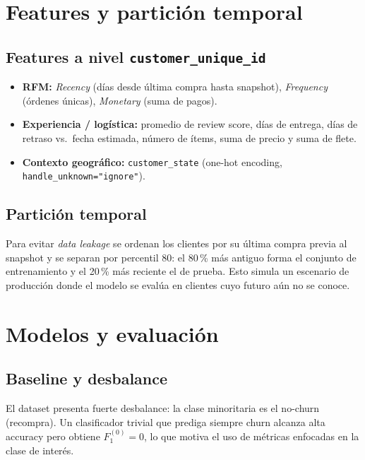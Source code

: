 \documentclass[11pt]{article}
\begin{document}
\section{Features y partición temporal}

\subsection*{Features a nivel \texttt{customer\_unique\_id}}

\begin{itemize}[itemsep=1pt, topsep=2pt]
  \item \textbf{RFM:} \textit{Recency} (días desde última compra hasta snapshot),
        \textit{Frequency} (órdenes únicas), \textit{Monetary} (suma de pagos).
  \item \textbf{Experiencia / logística:} promedio de review score, días de
        entrega, días de retraso vs.\ fecha estimada, número de ítems, suma de
        precio y suma de flete.
  \item \textbf{Contexto geográfico:} \texttt{customer\_state} (one-hot encoding,
        \texttt{handle\_unknown="ignore"}).
\end{itemize}

\subsection*{Partición temporal}

Para evitar \textit{data leakage} se ordenan los clientes por su última compra
previa al snapshot y se separan por percentil 80: el 80\,\% más antiguo forma el
conjunto de entrenamiento y el 20\,\% más reciente el de prueba. Esto simula un
escenario de producción donde el modelo se evalúa en clientes cuyo futuro aún no
se conoce.

\section{Modelos y evaluación}

\subsection*{Baseline y desbalance}

El dataset presenta fuerte desbalance: la clase minoritaria es el no-churn
(recompra). Un clasificador trivial que prediga siempre churn alcanza alta
accuracy pero obtiene $F_1^{(0)}=0$, lo que motiva el uso de métricas
enfocadas en la clase de interés.
\end{document}
